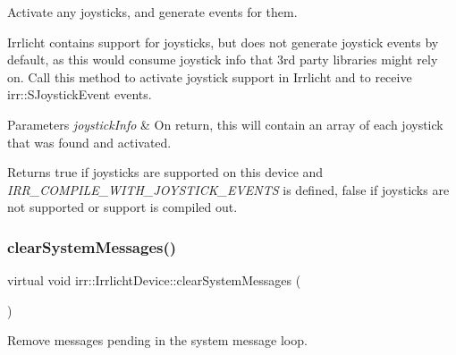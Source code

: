 Activate any joysticks, and generate events for them. 

Irrlicht contains support for joysticks, but does not generate joystick events by default, as this would consume joystick info that 3rd party libraries might rely on. Call this method to activate joystick support in Irrlicht and to receive irr\+::\+S\+Joystick\+Event events. 
\begin{DoxyParams}{Parameters}
{\em joystick\+Info} & On return, this will contain an array of each joystick that was found and activated. \\
\hline
\end{DoxyParams}
\begin{DoxyReturn}{Returns}
true if joysticks are supported on this device and {\itshape I\+R\+R\+\_\+\+C\+O\+M\+P\+I\+L\+E\+\_\+\+W\+I\+T\+H\+\_\+\+J\+O\+Y\+S\+T\+I\+C\+K\+\_\+\+E\+V\+E\+N\+TS} is defined, false if joysticks are not supported or support is compiled out. 
\end{DoxyReturn}
\mbox{\label{classirr_1_1IrrlichtDevice_aa10c6151a267d8a1500d5dc7b44425dd}} 
\subsubsection{\texorpdfstring{clear\+System\+Messages()}{clearSystemMessages()}\hspace{0.1cm}{\footnotesize\ttfamily [1/3]}}
{\footnotesize\ttfamily virtual void irr\+::\+Irrlicht\+Device\+::clear\+System\+Messages (\begin{DoxyParamCaption}{ }\end{DoxyParamCaption})\hspace{0.3cm}{\ttfamily [pure virtual]}}



Remove messages pending in the system message loop. 

